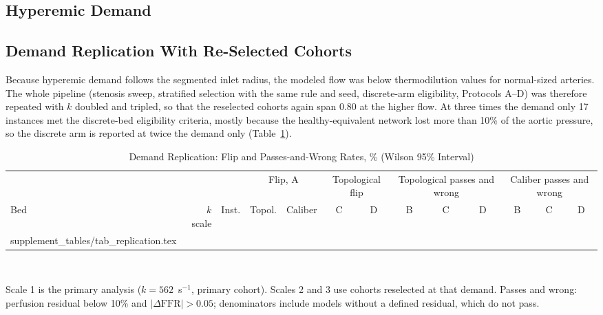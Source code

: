 \documentclass[journal,twoside,web,onecolumn]{ieeecolor}
\begin{document}
\FloatBarrier
\subsection{Hyperemic Demand}\label{sec:demand}


\FloatBarrier
\subsection{Demand Replication With Re-Selected Cohorts}\label{sec:replication}
Because hyperemic demand follows the segmented inlet radius, the modeled flow was below thermodilution values for
normal-sized arteries. The whole pipeline (stenosis sweep, stratified selection with the same rule and seed,
discrete-arm eligibility, Protocols A--D) was therefore repeated with $k$ doubled and tripled, so that the reselected
cohorts again span 0.80 at the higher flow. At three times the demand only 17 instances met the discrete-bed
eligibility criteria, mostly because the healthy-equivalent network lost more than 10\% of the aortic pressure, so the
discrete arm is reported at twice the demand only (Table~\ref{tab:repl}).
\begin{table}[!ht]
\caption{Demand Replication: Flip and Passes-and-Wrong Rates, \% (Wilson 95\% Interval)}\label{tab:repl}
\centering\footnotesize\setlength{\tabcolsep}{3pt}
\begin{tabular}{@{}lrrcccccccccc@{}}
\toprule
 & & & \multicolumn{2}{c}{Flip, A} & \multicolumn{2}{c}{Topological flip} & \multicolumn{3}{c}{Topological passes and wrong} & \multicolumn{3}{c}{Caliber passes and wrong}\\
\cmidrule(lr){4-5}\cmidrule(lr){6-7}\cmidrule(lr){8-10}\cmidrule(l){11-13}
Bed & $k$ scale & Inst. & Topol. & Caliber & C & D & B & C & D & B & C & D\\
\midrule
{} supplement_tables/tab_replication.tex 
\bottomrule
\end{tabular}
\\[3pt]
\parbox{0.95\textwidth}{\footnotesize Scale 1 is the primary analysis ($k = 562$~s$^{-1}$, primary cohort). Scales 2 and 3 use
cohorts reselected at that demand. Passes and wrong: perfusion residual below 10\% and $|\Delta\mathrm{FFR}| > 0.05$;
denominators include models without a defined residual, which do not pass.}
\end{table}

\FloatBarrier
\end{document}
